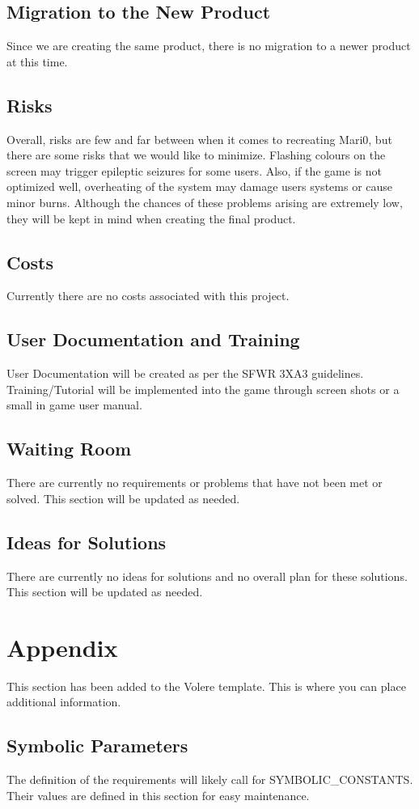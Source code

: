 \documentclass[12pt, titlepage]{article}
\begin{document}
\subsection{Migration to the New Product}
Since we are creating the same product, there is no migration to a newer product at this time.

\subsection{Risks}
Overall, risks are few and far between when it comes to recreating Mari0, but there are some risks that we would like to minimize. Flashing colours on the screen may trigger epileptic seizures for some users. Also, if the game is not optimized well, overheating of the system may damage users systems or cause minor burns. Although the chances of these problems arising are extremely low, they will be kept in mind when creating the final product.

\subsection{Costs}
Currently there are no costs associated with this project.

\subsection{User Documentation and Training}
User Documentation will be created as per the SFWR 3XA3 guidelines. Training/Tutorial will be implemented into the game through screen shots or a small in game user manual.

\subsection{Waiting Room}
There are currently no requirements or problems that have not been met or solved. This section will be updated as needed.

\subsection{Ideas for Solutions}
There are currently no ideas for solutions and no overall plan for these solutions. This section will be updated as needed.





\newpage

\section{Appendix}

This section has been added to the Volere template.  This is where you can place
additional information.

\subsection{Symbolic Parameters}

The definition of the requirements will likely call for SYMBOLIC\_CONSTANTS.
Their values are defined in this section for easy maintenance.
\end{document}
